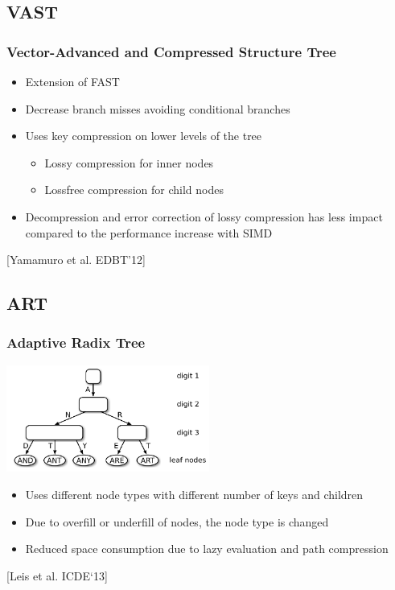 \documentclass{beamer}
\begin{document}
\subsection{VAST}
\begin{frame}
	\frametitle{Vector-Advanced and Compressed Structure Tree}
	\begin{itemize}
		\item Extension of FAST
		\item Decrease branch misses avoiding conditional branches
		\item Uses key compression on lower levels of the tree
		\begin{itemize}
			\item Lossy compression for inner nodes
			\item Lossfree compression for child nodes
		\end{itemize}
		\item  Decompression and error correction of lossy compression has less impact compared to the performance increase with SIMD
	\end{itemize}
	\vspace*{\fill}
	\begin{center}
		\tiny [Yamamuro et al. EDBT’12]
	\end{center}
\end{frame}

\subsection{ART}
\begin{frame}
	\frametitle{Adaptive Radix Tree}
	\begin{center}
		\includegraphics[width=0.5\textwidth]{img/art2.pdf}
	\end{center}
	\begin{itemize}
		\item Uses different node types with different number of keys and children
		\item Due to overfill or underfill of nodes, the node type is changed
		\item Reduced space consumption due to lazy evaluation and path compression
	\end{itemize}
	\begin{center}
		 \tiny [Leis et al.  ICDE`13]
	\end{center}

\end{frame}
\end{document}

